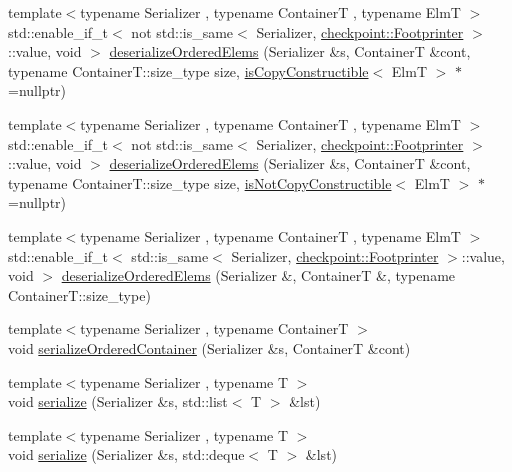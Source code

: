 \begin{DoxyCompactItemize}
{\footnotesize template$<$typename Serializer , typename ContainerT , typename ElmT $>$ }\\std\+::enable\+\_\+if\+\_\+t$<$ not std\+::is\+\_\+same$<$ Serializer, \hyperlink{structcheckpoint_1_1_footprinter}{checkpoint\+::\+Footprinter} $>$\+::value, void $>$ \hyperlink{namespacecheckpoint_af1b8445cbd2caf9c35727de1cf63c2d9}{deserialize\+Ordered\+Elems} (Serializer \&s, ContainerT \&cont, typename Container\+T\+::size\+\_\+type size, \hyperlink{namespacecheckpoint_a60a9850fa59d4b236b2f888baf135a95}{is\+Copy\+Constructible}$<$ ElmT $>$ $\ast$=nullptr)
\item 
{\footnotesize template$<$typename Serializer , typename ContainerT , typename ElmT $>$ }\\std\+::enable\+\_\+if\+\_\+t$<$ not std\+::is\+\_\+same$<$ Serializer, \hyperlink{structcheckpoint_1_1_footprinter}{checkpoint\+::\+Footprinter} $>$\+::value, void $>$ \hyperlink{namespacecheckpoint_abec445c1387cfe9c00c3c328b403378b}{deserialize\+Ordered\+Elems} (Serializer \&s, ContainerT \&cont, typename Container\+T\+::size\+\_\+type size, \hyperlink{namespacecheckpoint_a141a100f9dcca06fb0b6dbf44a5d6756}{is\+Not\+Copy\+Constructible}$<$ ElmT $>$ $\ast$=nullptr)
\item 
{\footnotesize template$<$typename Serializer , typename ContainerT , typename ElmT $>$ }\\std\+::enable\+\_\+if\+\_\+t$<$ std\+::is\+\_\+same$<$ Serializer, \hyperlink{structcheckpoint_1_1_footprinter}{checkpoint\+::\+Footprinter} $>$\+::value, void $>$ \hyperlink{namespacecheckpoint_a1022e2741b325048a74569a985eb7711}{deserialize\+Ordered\+Elems} (Serializer \&, ContainerT \&, typename Container\+T\+::size\+\_\+type)
\item 
{\footnotesize template$<$typename Serializer , typename ContainerT $>$ }\\void \hyperlink{namespacecheckpoint_a0b15edc50a881e06260e7112b2c60742}{serialize\+Ordered\+Container} (Serializer \&s, ContainerT \&cont)
\item 
{\footnotesize template$<$typename Serializer , typename T $>$ }\\void \hyperlink{namespacecheckpoint_afb32627049eb840e4f8b9fd3022f2eb2}{serialize} (Serializer \&s, std\+::list$<$ T $>$ \&lst)
\item 
{\footnotesize template$<$typename Serializer , typename T $>$ }\\void \hyperlink{namespacecheckpoint_a179b767294c9b23617f30fc4566d0be7}{serialize} (Serializer \&s, std\+::deque$<$ T $>$ \&lst)

\end{DoxyCompactItemize}
